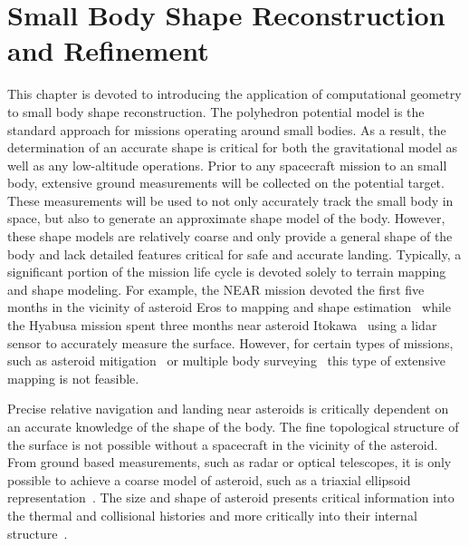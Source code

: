 
\chapter{Small Body Shape Reconstruction and Refinement}\label{sec:shape_reconstruction}

This chapter is devoted to introducing the application of computational geometry to small body shape reconstruction.
The polyhedron potential model is the standard approach for missions operating around small bodies.
As a result, the determination of an accurate shape is critical for both the gravitational model as well as any low-altitude operations.
Prior to any spacecraft mission to an small body, extensive ground measurements will be collected on the potential target.
These measurements will be used to not only accurately track the small body in space, but also to generate an approximate shape model of the body. 
However, these shape models are relatively coarse and only provide a general shape of the body and lack detailed features critical for safe and accurate landing.
Typically, a significant portion of the mission life cycle is devoted solely to terrain mapping and shape modeling.
For example, the NEAR mission devoted the first five months in the vicinity of asteroid Eros to mapping and shape estimation~\cite{antreasian2002} while the Hyabusa mission spent three months near asteroid Itokawa~\cite{barnouin-jha2008} using a \gls{lidar} sensor to accurately measure the surface.
However, for certain types of missions, such as asteroid mitigation~\cite{garshnek2000,pitz2014} or multiple body surveying~\cite{stuart2011a,stuart2016} this type of extensive mapping is not feasible.

Precise relative navigation and landing near asteroids is critically dependent on an accurate knowledge of the shape of the body.
The fine topological structure of the surface is not possible without a spacecraft in the vicinity of the asteroid.
From ground  based measurements, such as radar or optical telescopes, it is only possible to achieve a coarse model of asteroid, such as a triaxial ellipsoid representation~\cite{hudson1994}.
The size and shape of asteroid presents critical information into the thermal and collisional histories and more critically into their internal structure~\cite{cole1998}.


